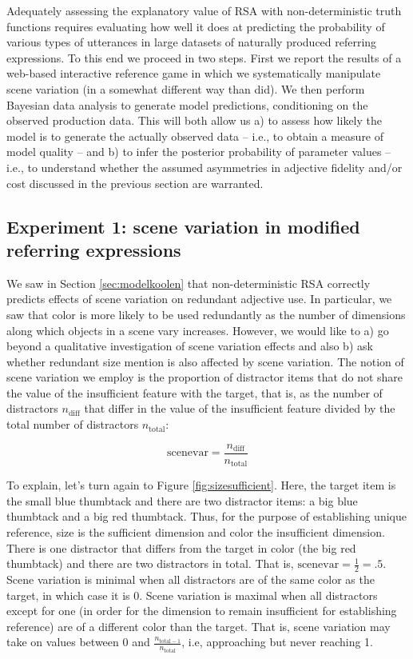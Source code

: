 \documentclass[11pt]{article}
\newcommand{\figref}[1]{Figure \ref{#1}}
\newcommand{\sectionref}[1]{Section \ref{#1}}
\begin{document}
Adequately assessing the explanatory value of RSA with non-deterministic truth functions requires evaluating how well it does at predicting the probability of various types of utterances in large datasets of naturally produced referring expressions. To this end we proceed in two steps. First we report the results of a web-based interactive reference game in which we systematically manipulate scene variation (in a somewhat different way than  did). We then perform Bayesian data analysis to generate model predictions, conditioning on the observed production data. This will both allow us a) to assess  how likely the model is to generate the actually observed data -- i.e., to obtain a measure of model quality -- and b) to infer the posterior probability of parameter values -- i.e., to understand whether the assumed asymmetries in adjective fidelity and/or cost discussed in the previous section are warranted.


\subsection{Experiment 1: scene variation in modified referring expressions}
\label{sec:exp1-scenevar}

We saw in \sectionref{sec:modelkoolen} that non-deterministic RSA correctly predicts effects of scene variation on redundant adjective use. In particular, we saw that color is more likely to be used redundantly as the number of dimensions along which objects in a scene vary increases. However, we would like to a) go beyond a qualitative investigation of scene variation effects and also b) ask whether redundant size mention is also affected by scene variation. The notion of scene variation we employ is the proportion of distractor items that do not share the value of the insufficient feature with the target, that is, as the number of distractors $n_{\textrm{diff}}$ that differ in the value of the insufficient feature divided by the total number of distractors $n_{\textrm{total}}$:

\begin{equation*}
	\textrm{scenevar} = \frac{n_{\textrm{diff}}}{n_{\textrm{total}}}
\end{equation*}

To explain, let's turn again to \figref{fig:sizesufficient}. Here, the target item is the small blue thumbtack and there are two distractor items: a big blue thumbtack and a big red thumbtack. Thus, for the purpose of establishing unique reference, size is the sufficient dimension and color the insufficient dimension. There is one distractor that differs from the target in color (the big red thumbtack) and there are two distractors in total. That is, $\textrm{scenevar} = \frac{1}{2} = .5$. Scene variation is minimal when all distractors are of the same color as the target, in which case it is 0. Scene variation is maximal when all distractors except for one (in order for the dimension to remain insufficient for establishing reference) are of a different color than the target. That is, scene variation may take on values between 0 and $\frac{n_{\textrm{total} - 1}}{n_{\textrm{total}}}$, i.e, approaching but never reaching 1.
\end{document}
